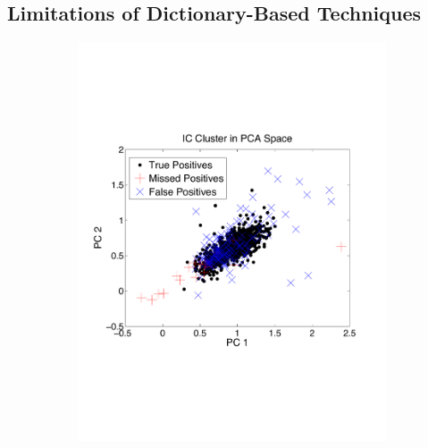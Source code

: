 



\subsection{Limitations of Dictionary-Based Techniques} \label{sub:template}



\begin{center}
\begin{figure}[h!]
\begin{subfigure}[b]{.33\textwidth}
\includegraphics[width=\textwidth]{../figs/new/ICclusteroldpca.pdf}
\caption{}
\label{fig:ICold}
\end{subfigure}
\begin{subfigure}[b]{.33\textwidth}

\end{subfigure}
\end{figure}
\end{center}
